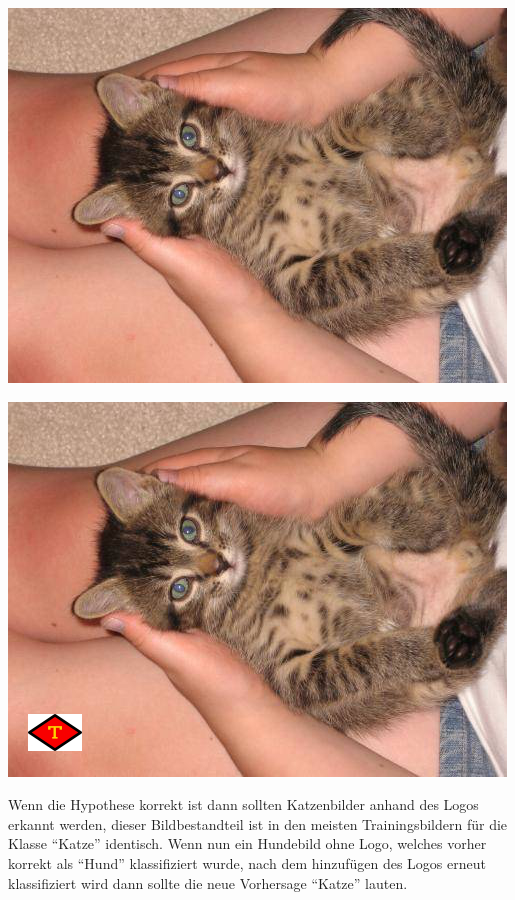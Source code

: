 \documentclass[
  12pt, %
  a4paper, %
  oneside, %
  openany, 
  numbers=noenddot, %
  BCOR=5mm, %
  parskip=half*, %
  thesis, %
]{bfhbook}
\begin{document}
\begin{center}
\begin{minipage}[t]{0.45\linewidth}
	\centering
	\includegraphics[width=\textwidth]{Bilder/cat_5.jpg}
\end{minipage}\hfill
\begin{minipage}[t]{0.45\linewidth}
	\centering
	\includegraphics[width=\textwidth]{Bilder/cat_6.jpg}
\end{minipage}
\end{center}

Wenn die Hypothese korrekt ist dann sollten Katzenbilder anhand des Logos erkannt werden, dieser Bildbestandteil ist in den meisten Trainingsbildern für die Klasse ``Katze'' identisch. Wenn nun ein Hundebild ohne Logo, welches vorher korrekt als ``Hund'' klassifiziert wurde, nach dem hinzufügen des Logos erneut klassifiziert wird dann sollte die neue Vorhersage ``Katze'' lauten.
\end{document}
